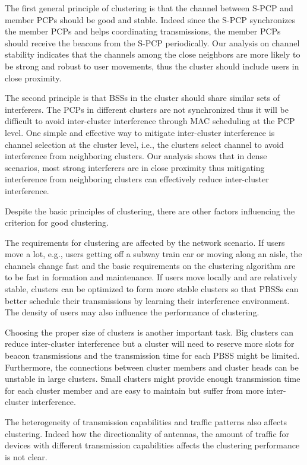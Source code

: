 \documentclass[10pt, conference, letterpaper]{IEEEtran}
\begin{document}
The first general principle of clustering is that the channel between S-PCP and member PCPs should be good and stable. 
Indeed since the S-PCP synchronizes the member PCPs and helps coordinating transmissions, the member PCPs should receive the beacons from the S-PCP periodically. 
Our analysis on channel stability indicates that the channels among the close neighbors are more likely to be strong and  robust to user movements, thus the cluster should include users in close proximity. 

The second principle is that BSSs in the cluster should share similar sets of interferers. 
The PCPs in different clusters are not synchronized thus it will be difficult to avoid inter-cluster interference through MAC scheduling at the PCP level. 
One simple and effective way to mitigate inter-cluster interference is channel selection at the cluster level, i.e., the clusters select channel to avoid interference from neighboring clusters. 
Our analysis shows that in dense scenarios, most strong interferers are in close proximity thus mitigating interference from neighboring clusters can effectively reduce inter-cluster interference. 

Despite the basic principles of clustering, there are other factors influencing the criterion for good clustering.

The requirements for clustering are affected by the network scenario. 
If users move a lot, e.g., users getting off a subway train car or moving along an aisle, the channels change fast and the basic requirements on the clustering algorithm are to be fast in formation and maintenance. 
If users move locally and are relatively stable, clusters can be optimized to form more stable clusters so that PBSSs can better schedule their transmissions by learning their interference environment. 
The density of users may also influence the performance of clustering.

Choosing the proper size of clusters is another important task. 
Big clusters can reduce inter-cluster interference but a cluster will need to reserve more slots for beacon transmissions and the transmission time for each PBSS might be limited. 
Furthermore, the connections between cluster members and cluster heads can be unstable in large clusters.
Small clusters might provide enough transmission time for each cluster member and are easy to maintain but suffer from more inter-cluster interference.

The heterogeneity of transmission capabilities and traffic patterns also affects clustering. 
Indeed how the directionality of antennas, the amount of traffic for devices with different transmission capabilities affects the clustering performance is not clear. 
\end{document}

